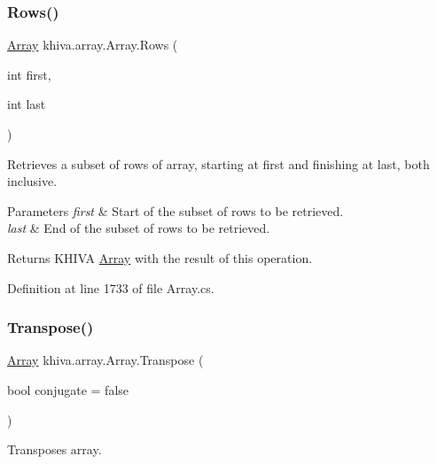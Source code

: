 \subsubsection{\texorpdfstring{Rows()}{Rows()}}
{\footnotesize\ttfamily \mbox{\hyperlink{classkhiva_1_1array_1_1_array}{Array}} khiva.\+array.\+Array.\+Rows (\begin{DoxyParamCaption}\item[{int}]{first,  }\item[{int}]{last }\end{DoxyParamCaption})\hspace{0.3cm}{\ttfamily [inline]}}



Retrieves a subset of rows of array, starting at first and finishing at last, both inclusive. 


\begin{DoxyParams}{Parameters}
{\em first} & Start of the subset of rows to be retrieved.\\
\hline
{\em last} & End of the subset of rows to be retrieved.\\
\hline
\end{DoxyParams}
\begin{DoxyReturn}{Returns}
K\+H\+I\+VA \mbox{\hyperlink{classkhiva_1_1array_1_1_array}{Array}} with the result of this operation.
\end{DoxyReturn}


Definition at line 1733 of file Array.\+cs.

\mbox{\label{classkhiva_1_1array_1_1_array_a51c8e2b81d2305bad110957c7c495e9e}} 
\subsubsection{\texorpdfstring{Transpose()}{Transpose()}}
{\footnotesize\ttfamily \mbox{\hyperlink{classkhiva_1_1array_1_1_array}{Array}} khiva.\+array.\+Array.\+Transpose (\begin{DoxyParamCaption}\item[{bool}]{conjugate = {\ttfamily false} }\end{DoxyParamCaption})\hspace{0.3cm}{\ttfamily [inline]}}



Transposes array. 


